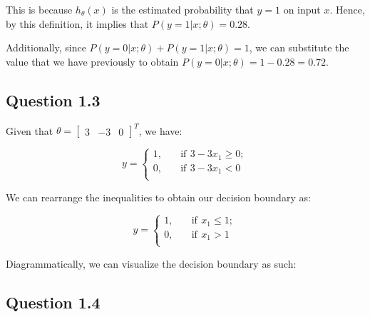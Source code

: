 \documentclass[11pt,fancychapters]{article}
\begin{document}
This is because $h_\theta(x)$ is the estimated probability that $y = 1$ on input $x$. Hence, by this definition, it implies that $P(y=1|x;\theta) = 0.28$.

Additionally, since $P(y=0|x;\theta) + P(y=1|x;\theta) = 1$, we can substitute the value that we have previously to obtain $P(y=0|x;\theta) = 1 - 0.28 = 0.72$.

\subsection*{Question 1.3}

Given that $\theta = \begin{bmatrix}3 & -3 & 0\end{bmatrix}^T$, we have:

\begin{equation*}
	y = \begin{cases}
	1, \quad &\text{if} \, ~ 3 - 3x_1 \geq 0; \\
	0, \quad &\text{if} \, ~ 3 - 3x_1 < 0 \\
	\end{cases}	
\end{equation*}

We can rearrange the inequalities to obtain our decision boundary as:

\begin{equation*}
	y = \begin{cases}
		1, \quad &\text{if} \, ~ x_1 \leq 1; \\
		0, \quad &\text{if} \, ~ x_1 > 1 \\
	\end{cases}	
\end{equation*}

Diagrammatically, we can visualize the decision boundary as such:

\begin{figure}[!h]
	\centering
\end{figure}

\subsection*{Question 1.4}
\end{document}
